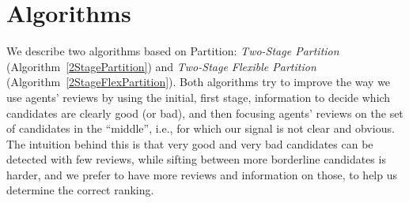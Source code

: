 \documentclass[letterpaper]{article} %
\newcommand{\omer}[1]{\textcolor{red}{\textbf{Omer Says:} #1 }}
\begin{document}

\section{Algorithms}\label{algos}
We describe two algorithms based on Partition: \emph{Two-Stage Partition} (Algorithm~\ref{2StagePartition}) and \emph{Two-Stage Flexible Partition} (Algorithm~\ref{2StageFlexPartition}). Both algorithms try to improve the way we use agents' reviews by using the initial, first stage, information to decide which candidates are clearly good (or bad), and then focusing agents' reviews on the set of candidates in the ``middle'', i.e., for which our signal is not clear and obvious. The intuition behind this is that very good and very bad candidates can be detected with few reviews, while sifting between more borderline candidates is harder, and we prefer to have more reviews and information on those, to help us determine the correct ranking.
\end{document}
